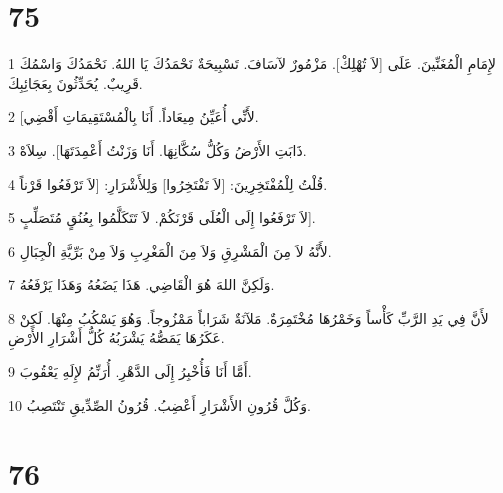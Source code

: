 \chapter{75}

\par 1 لإِمَامِ الْمُغَنِّينَ. عَلَى [لاَ تُهْلِكْ]. مَزْمُورٌ لآسَافَ. تَسْبِيحَةٌ نَحْمَدُكَ يَا اللهُ. نَحْمَدُكَ وَاسْمُكَ قَرِيبٌ. يُحَدِّثُونَ بِعَجَائِبِكَ.
\par 2 [لأَنِّي أُعَيِّنُ مِيعَاداً. أَنَا بِالْمُسْتَقِيمَاتِ أَقْضِي.
\par 3 ذَابَتِ الأَرْضُ وَكُلُّ سُكَّانِهَا. أَنَا وَزَنْتُ أَعْمِدَتَهَا]. سِلاَهْ.
\par 4 قُلْتُ لِلْمُفْتَخِرِينَ: [لاَ تَفْتَخِرُوا] وَلِلأَشْرَارِ: [لاَ تَرْفَعُوا قَرْناً.
\par 5 لاَ تَرْفَعُوا إِلَى الْعُلَى قَرْنَكُمْ. لاَ تَتَكَلَّمُوا بِعُنُقٍ مُتَصَلِّبٍ].
\par 6 لأَنَّهُ لاَ مِنَ الْمَشْرِقِ وَلاَ مِنَ الْمَغْرِبِ وَلاَ مِنْ بَرِّيَّةِ الْجِبَالِ.
\par 7 وَلَكِنَّ اللهَ هُوَ الْقَاضِي. هَذَا يَضَعُهُ وَهَذَا يَرْفَعُهُ.
\par 8 لأَنَّ فِي يَدِ الرَّبِّ كَأْساً وَخَمْرُهَا مُخْتَمِرَةٌ. مَلآنَةٌ شَرَاباً مَمْزُوجاً. وَهُوَ يَسْكُبُ مِنْهَا. لَكِنْ عَكَرُهَا يَمَصُّهُ يَشْرَبُهُ كُلُّ أَشْرَارِ الأَرْضِ.
\par 9 أَمَّا أَنَا فَأُخْبِرُ إِلَى الدَّهْرِ. أُرَنِّمُ لإِلَهِ يَعْقُوبَ.
\par 10 وَكُلَّ قُرُونِ الأَشْرَارِ أَعْضِبُ. قُرُونُ الصِّدِّيقِ تَنْتَصِبُ.

\chapter{76}


